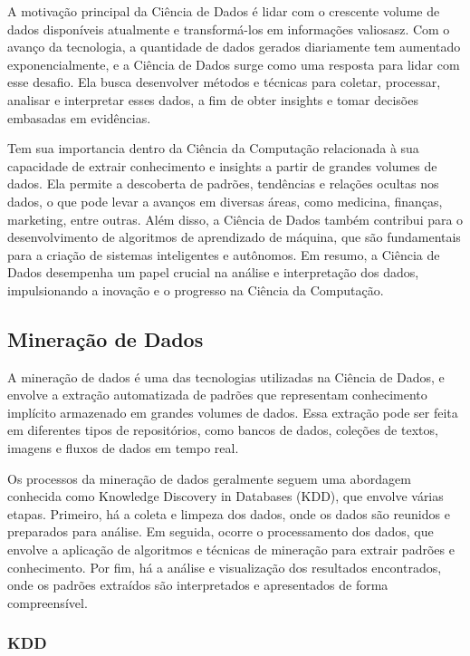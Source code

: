 \documentclass[tcc2]{classe_uftex/uftex}
\begin{document}
A motivação principal da Ciência de Dados é lidar com o crescente volume de dados disponíveis atualmente e transformá-los em informações valiosasz\cite{gomes2019mineraccao}. Com o avanço da tecnologia, a quantidade de dados gerados diariamente tem aumentado exponencialmente, e a Ciência de Dados surge como uma resposta para lidar com esse desafio. Ela busca desenvolver métodos e técnicas para coletar, processar, analisar e interpretar esses dados, a fim de obter insights e tomar decisões embasadas em evidências.

Tem sua importancia dentro da Ciência da Computação relacionada à sua capacidade de extrair conhecimento e insights a partir de grandes volumes de dados. Ela permite a descoberta de padrões, tendências e relações ocultas nos dados, o que pode levar a avanços em diversas áreas, como medicina, finanças, marketing, entre outras. Além disso, a Ciência de Dados também contribui para o desenvolvimento de algoritmos de aprendizado de máquina, que são fundamentais para a criação de sistemas inteligentes e autônomos. Em resumo, a Ciência de Dados desempenha um papel crucial na análise e interpretação dos dados, impulsionando a inovação e o progresso na Ciência da Computação.

\subsection{Mineração de Dados}

A mineração de dados é uma das tecnologias utilizadas na Ciência de Dados, e envolve a extração automatizada de padrões que representam conhecimento implícito armazenado em grandes volumes de dados. Essa extração pode ser feita em diferentes tipos de repositórios, como bancos de dados, coleções de textos, imagens e fluxos de dados em tempo real. 

Os processos da mineração de dados geralmente seguem uma abordagem conhecida como Knowledge Discovery in Databases (KDD), que envolve várias etapas. Primeiro, há a coleta e limpeza dos dados, onde os dados são reunidos e preparados para análise. Em seguida, ocorre o processamento dos dados, que envolve a aplicação de algoritmos e técnicas de mineração para extrair padrões e conhecimento. Por fim, há a análise e visualização dos resultados encontrados, onde os padrões extraídos são interpretados e apresentados de forma compreensível.\cite{marban2009data}

\subsubsection{KDD}
\end{document}
